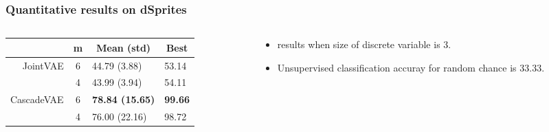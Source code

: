 \documentclass[10pt,mathserif]{beamer}
\begin{document}
\begin{frame}
\frametitle{Quantitative results on dSprites}
\begin{columns}
\begin{column}{0.5\textwidth}
\begin{table}[htbp]
\fontsize{9pt}{9.5pt}\selectfont
\centering
\begin{tabular}{rc ll}
\addlinespace[-\aboverulesep]
\toprule
\multicolumn{1}{c}{Method}&m&\multicolumn{1}{c}{Mean (std)}&\multicolumn{1}{c}{Best}\\
\toprule
JointVAE & 6&44.79 (3.88) &53.14\\
        &  4&43.99 (3.94) &54.11\\
\midrule
CascadeVAE &6&\textbf{78.84 (15.65)}& \textbf{99.66}\\
                &4&76.00 (22.16)& 98.72\\
\bottomrule
\end{tabular}
\end{table}
\end{column}
\begin{column}{0.4\textwidth}
\begin{itemize}\itemsep=12pt
\item {\color{blue}{Unsupervised classification}} results when size of discrete variable is 3.
\item Unsupervised classification accuray for random chance is $33.33$.
\end{itemize}

\end{column}
\end{columns}
\end{frame}



\end{document}
